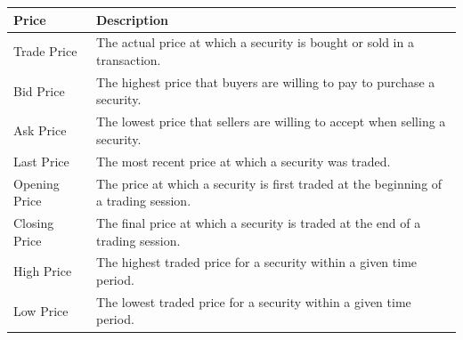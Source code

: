 \documentclass[11pt]{article}
\begin{document}
\begin{center}
\begin{tabular}{ll}
\hline
Price & Description\\[0pt]
\hline
Trade Price & The actual price at which a security is bought or sold in a transaction.\\[0pt]
Bid Price & The highest price that buyers are willing to pay to purchase a security.\\[0pt]
Ask Price & The lowest price that sellers are willing to accept when selling a security.\\[0pt]
Last Price & The most recent price at which a security was traded.\\[0pt]
Opening Price & The price at which a security is first traded at the beginning of a trading session.\\[0pt]
Closing Price & The final price at which a security is traded at the end of a trading session.\\[0pt]
High Price & The highest traded price for a security within a given time period.\\[0pt]
Low Price & The lowest traded price for a security within a given time period.\\[0pt]
\hline
\end{tabular}
\end{center}
\end{document}

